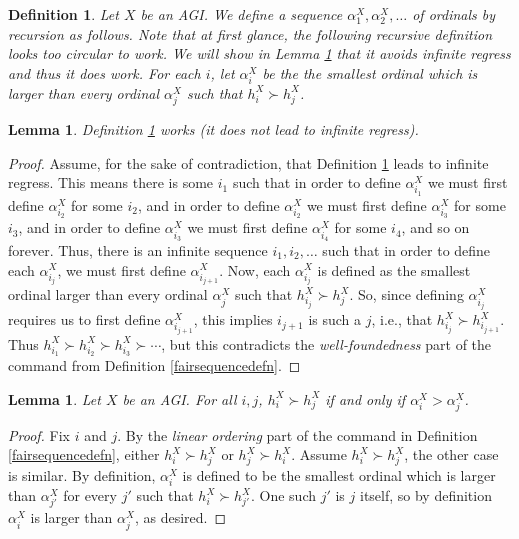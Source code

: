 \documentclass{article}
\newtheorem{definition}[theorem]{Definition}
\newtheorem{lemma}[theorem]{Lemma}
\begin{document}
\begin{definition}
\label{alphaidefn}
    Let $X$ be an AGI. We define a sequence $\alpha^X_1,\alpha^X_2,\ldots$
    of ordinals by recursion as follows. Note that at first glance,
    the following recursive definition looks too circular to work.
    We will show in Lemma \ref{transfiniterecursionmagiclemma} that
    it avoids infinite regress and thus
    it does work. For each $i$, let $\alpha^X_i$ be the the smallest
    ordinal which is larger than every ordinal $\alpha^X_j$ such that
    $h^X_i\succ h^X_j$.
\end{definition}

\begin{lemma}
\label{transfiniterecursionmagiclemma}
    Definition \ref{alphaidefn} works (it does not lead to infinite regress).
\end{lemma}

\begin{proof}
    Assume, for the sake of contradiction, that Definition \ref{alphaidefn}
    leads to infinite regress. This means there is some $i_1$ such that
    in order to define $\alpha^X_{i_1}$ we must first define $\alpha^X_{i_2}$
    for some $i_2$, and in order to define $\alpha^X_{i_2}$ we must first
    define $\alpha^X_{i_3}$ for some $i_3$, and in order to define
    $\alpha^X_{i_3}$ we must first define $\alpha^X_{i_4}$ for some $i_4$,
    and so on forever. Thus, there is an infinite sequence $i_1,i_2,\ldots$
    such that in order to define each $\alpha^X_{i_j}$, we must first
    define $\alpha^X_{i_{j+1}}$. Now, each $\alpha^X_{i_j}$ is defined as
    the smallest ordinal larger than every ordinal $\alpha^X_j$ such that
    $h^X_{i_j}\succ h^X_j$. So, since defining $\alpha^X_{i_j}$ requires
    us to first define $\alpha^X_{i_{j+1}}$, this implies $i_{j+1}$ is
    such a $j$, i.e., that $h^X_{i_j}\succ h^X_{i_{j+1}}$.
    Thus $h^X_{i_1}\succ h^X_{i_2}\succ h^X_{i_3}\succ\cdots$,
    but this contradicts the \emph{well-foundedness} part of the command
    from Definition \ref{fairsequencedefn}.
\end{proof}

\begin{lemma}
\label{technicallemmaaboutalphaXi}
    Let $X$ be an AGI. For all $i,j$,
    $h^X_i\succ h^X_j$ if and only if $\alpha^X_i>\alpha^X_j$.
\end{lemma}

\begin{proof}
    Fix $i$ and $j$.
    By the \emph{linear ordering} part of the command in Definition
    \ref{fairsequencedefn}, either $h^X_i\succ h^X_j$ or $h^X_j\succ h^X_i$.
    Assume $h^X_i\succ h^X_j$, the other case is similar.
    By definition, $\alpha^X_i$ is defined to be the smallest ordinal
    which is larger than $\alpha^X_{j'}$ for every $j'$ such that
    $h^X_i\succ h^X_{j'}$. One such $j'$ is $j$ itself,
    so by definition $\alpha^X_i$ is larger than $\alpha^X_j$, as desired.
\end{proof}
\end{document}
